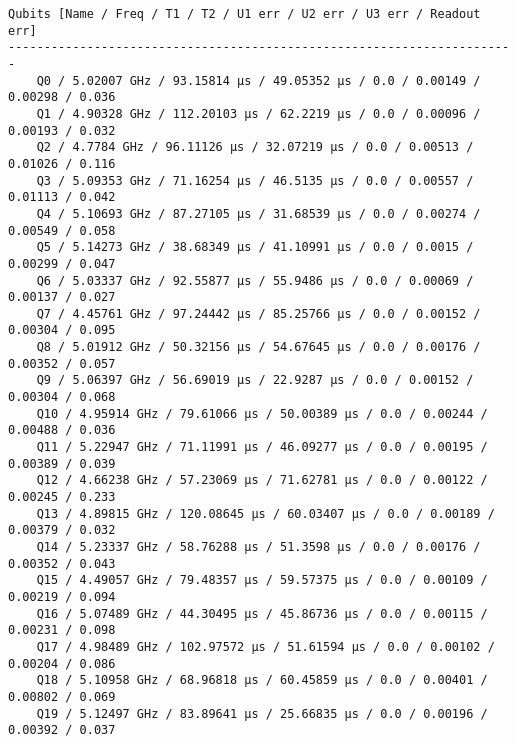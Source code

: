 \documentclass[11pt]{article}
\begin{document}
\begin{Verbatim}[commandchars=\\\{\}]
Qubits [Name / Freq / T1 / T2 / U1 err / U2 err / U3 err / Readout err]
-----------------------------------------------------------------------
    Q0 / 5.02007 GHz / 93.15814 µs / 49.05352 µs / 0.0 / 0.00149 / 0.00298 / 0.036
    Q1 / 4.90328 GHz / 112.20103 µs / 62.2219 µs / 0.0 / 0.00096 / 0.00193 / 0.032
    Q2 / 4.7784 GHz / 96.11126 µs / 32.07219 µs / 0.0 / 0.00513 / 0.01026 / 0.116
    Q3 / 5.09353 GHz / 71.16254 µs / 46.5135 µs / 0.0 / 0.00557 / 0.01113 / 0.042
    Q4 / 5.10693 GHz / 87.27105 µs / 31.68539 µs / 0.0 / 0.00274 / 0.00549 / 0.058
    Q5 / 5.14273 GHz / 38.68349 µs / 41.10991 µs / 0.0 / 0.0015 / 0.00299 / 0.047
    Q6 / 5.03337 GHz / 92.55877 µs / 55.9486 µs / 0.0 / 0.00069 / 0.00137 / 0.027
    Q7 / 4.45761 GHz / 97.24442 µs / 85.25766 µs / 0.0 / 0.00152 / 0.00304 / 0.095
    Q8 / 5.01912 GHz / 50.32156 µs / 54.67645 µs / 0.0 / 0.00176 / 0.00352 / 0.057
    Q9 / 5.06397 GHz / 56.69019 µs / 22.9287 µs / 0.0 / 0.00152 / 0.00304 / 0.068
    Q10 / 4.95914 GHz / 79.61066 µs / 50.00389 µs / 0.0 / 0.00244 / 0.00488 / 0.036
    Q11 / 5.22947 GHz / 71.11991 µs / 46.09277 µs / 0.0 / 0.00195 / 0.00389 / 0.039
    Q12 / 4.66238 GHz / 57.23069 µs / 71.62781 µs / 0.0 / 0.00122 / 0.00245 / 0.233
    Q13 / 4.89815 GHz / 120.08645 µs / 60.03407 µs / 0.0 / 0.00189 / 0.00379 / 0.032
    Q14 / 5.23337 GHz / 58.76288 µs / 51.3598 µs / 0.0 / 0.00176 / 0.00352 / 0.043
    Q15 / 4.49057 GHz / 79.48357 µs / 59.57375 µs / 0.0 / 0.00109 / 0.00219 / 0.094
    Q16 / 5.07489 GHz / 44.30495 µs / 45.86736 µs / 0.0 / 0.00115 / 0.00231 / 0.098
    Q17 / 4.98489 GHz / 102.97572 µs / 51.61594 µs / 0.0 / 0.00102 / 0.00204 / 0.086
    Q18 / 5.10958 GHz / 68.96818 µs / 60.45859 µs / 0.0 / 0.00401 / 0.00802 / 0.069
    Q19 / 5.12497 GHz / 83.89641 µs / 25.66835 µs / 0.0 / 0.00196 / 0.00392 / 0.037


\end{Verbatim}
\end{document}

